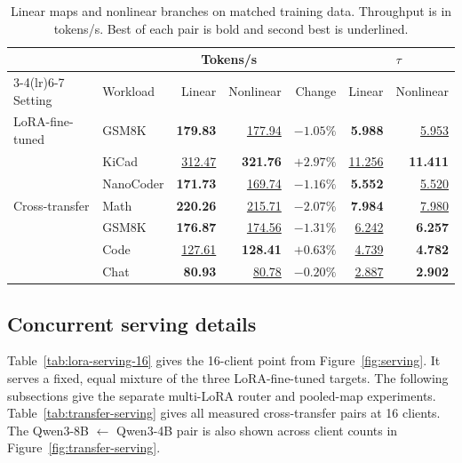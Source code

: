\begin{table}[htbp]
\centering
\caption{Linear maps and nonlinear branches on matched training data. Throughput is in tokens/s. Best of each pair is bold and second best is underlined.}
\label{tab:ablation-capacity}
\small
\begin{tabular}{llrrrrr}
\toprule
& & \multicolumn{2}{c}{Tokens/s} & & \multicolumn{2}{c}{$\tau$} \\
\cmidrule(lr){3-4}\cmidrule(lr){6-7}
Setting & Workload & Linear & Nonlinear & Change & Linear & Nonlinear \\
\midrule
LoRA-fine-tuned & GSM8K & \textbf{179.83} & \underline{177.94} & $-1.05\%$ & \textbf{5.988} & \underline{5.953} \\
 & KiCad & \underline{312.47} & \textbf{321.76} & $+2.97\%$ & \underline{11.256} & \textbf{11.411} \\
 & NanoCoder & \textbf{171.73} & \underline{169.74} & $-1.16\%$ & \textbf{5.552} & \underline{5.520} \\
\midrule
Cross-transfer & Math & \textbf{220.26} & \underline{215.71} & $-2.07\%$ & \textbf{7.984} & \underline{7.980} \\
 & GSM8K & \textbf{176.87} & \underline{174.56} & $-1.31\%$ & \underline{6.242} & \textbf{6.257} \\
 & Code & \underline{127.61} & \textbf{128.41} & $+0.63\%$ & \underline{4.739} & \textbf{4.782} \\
 & Chat & \textbf{80.93} & \underline{80.78} & $-0.20\%$ & \underline{2.887} & \textbf{2.902} \\
\bottomrule
\end{tabular}
\end{table}

\subsection{Concurrent serving details}
\label{app:serving-details}

Table~\ref{tab:lora-serving-16} gives the 16-client point from Figure~\ref{fig:serving}. It serves a fixed, equal mixture of the three LoRA-fine-tuned targets. The following subsections give the separate multi-LoRA router and pooled-map experiments. Table~\ref{tab:transfer-serving} gives all measured cross-transfer pairs at 16 clients. The Qwen3-8B $\leftarrow$ Qwen3-4B pair is also shown across client counts in Figure~\ref{fig:transfer-serving}.

